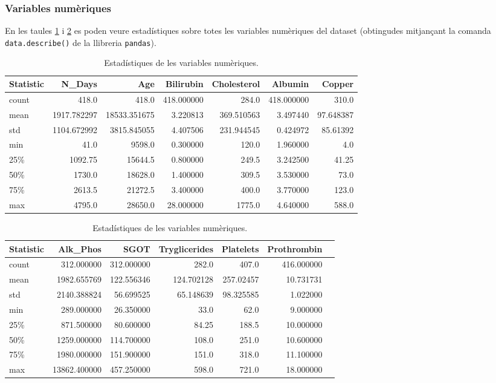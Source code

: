 \subsubsection{Variables numèriques}
En les taules \ref{tab:num-stats-1} i \ref{tab:num-stats-2} es poden veure estadístiques sobre totes les variables numèriques del dataset (obtingudes mitjançant la comanda \texttt{data.describe()} de la llibreria \texttt{pandas}).

\begin{table}[H]
\centering
\begin{tabular}{lrrrrrr}
\hline
\textbf{Statistic} & \textbf{N\_Days} & \textbf{Age} & \textbf{Bilirubin} & \textbf{Cholesterol} & \textbf{Albumin} & \textbf{Copper} \\ 
\hline
count & 418.0 & 418.0 & 418.000000 & 284.0 & 418.000000 & 310.0 \\ 
mean & 1917.782297 & 18533.351675 & 3.220813 & 369.510563 & 3.497440 & 97.648387 \\ 
std & 1104.672992 & 3815.845055 & 4.407506 & 231.944545 & 0.424972 & 85.61392 \\ 
min & 41.0 & 9598.0 & 0.300000 & 120.0 & 1.960000 & 4.0 \\ 
25\% & 1092.75 & 15644.5 & 0.800000 & 249.5 & 3.242500 & 41.25 \\ 
50\% & 1730.0 & 18628.0 & 1.400000 & 309.5 & 3.530000 & 73.0 \\ 
75\% & 2613.5 & 21272.5 & 3.400000 & 400.0 & 3.770000 & 123.0 \\ 
max & 4795.0 & 28650.0 & 28.000000 & 1775.0 & 4.640000 & 588.0 \\
\hline
\end{tabular}
\caption{Estadístiques de les variables numèriques.}
\label{tab:num-stats-1}
\end{table}

\begin{table}[H]
\centering
\begin{tabular}{lrrrrrr}
\hline
\textbf{Statistic} & \textbf{Alk\_Phos} & \textbf{SGOT} & \textbf{Tryglicerides} & \textbf{Platelets} & \textbf{Prothrombin} \\ 
\hline
count & 312.000000 & 312.000000 & 282.0 & 407.0 & 416.000000 \\ 
mean & 1982.655769 & 122.556346 & 124.702128 & 257.02457 & 10.731731 \\ 
std & 2140.388824 & 56.699525 & 65.148639 & 98.325585 & 1.022000 \\ 
min & 289.000000 & 26.350000 & 33.0 & 62.0 & 9.000000 \\ 
25\% & 871.500000 & 80.600000 & 84.25 & 188.5 & 10.000000 \\ 
50\% & 1259.000000 & 114.700000 & 108.0 & 251.0 & 10.600000 \\ 
75\% & 1980.000000 & 151.900000 & 151.0 & 318.0 & 11.100000 \\ 
max & 13862.400000 & 457.250000 & 598.0 & 721.0 & 18.000000 \\
\hline
\end{tabular}
\caption{Estadístiques de les variables numèriques.}
\label{tab:num-stats-2}
\end{table}


